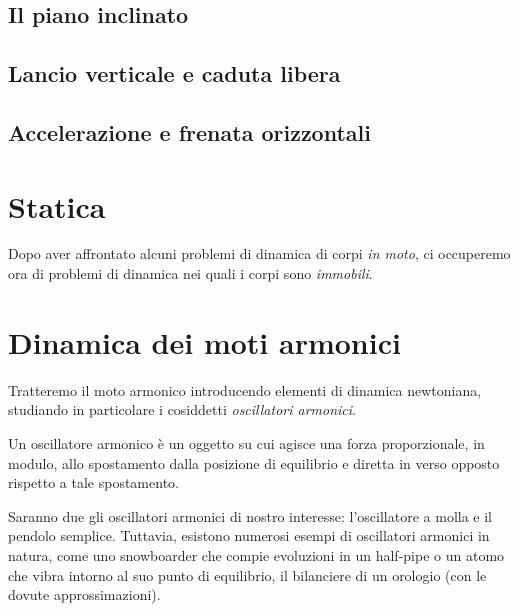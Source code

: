 \subsection{Il piano inclinato}

\subsection{Lancio verticale e caduta libera}

\subsection{Accelerazione e frenata orizzontali}


\section{Statica}
Dopo aver affrontato alcuni problemi di dinamica di corpi \textit{in
moto}, ci occuperemo ora di problemi di dinamica nei quali i corpi
sono \textit{immobili}.


\section{Dinamica dei moti armonici}
Tratteremo il moto armonico introducendo elementi di dinamica newtoniana,
studiando in particolare i cosiddetti \textit{oscillatori armonici}.

\begin{tcolorbox}[colback = yellow!30, colframe = yellow!30!black, title = {Oscillatore armonico}]
    Un oscillatore armonico è un oggetto su cui agisce una forza proporzionale,
    in modulo, allo spostamento dalla posizione di equilibrio e diretta in
    verso opposto rispetto a tale spostamento.
\end{tcolorbox}

\noindent Saranno due gli oscillatori armonici di nostro interesse: l'oscillatore a
molla e il pendolo semplice. Tuttavia, esistono numerosi esempi di oscillatori
armonici in natura, come uno snowboarder che compie evoluzioni in un half-pipe o
un atomo che vibra intorno al suo punto di equilibrio, il bilanciere di un
orologio (con le dovute approssimazioni).



